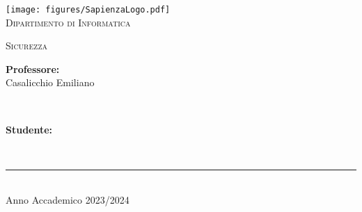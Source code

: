 \begin{titlepage}
	\centering
    \vspace*{0.5 cm}
    \texttt{[image: figures/SapienzaLogo.pdf]}\\[1.0 cm]	%

    \vspace*{-0.4cm}
    \textsc{\large Dipartimento di Informatica}\\[2.0 cm]	%
    \vspace*{1cm}

    { \fontsize{20.74pt}{18.5pt}\selectfont\bfseries \thetitle \par } %

    \vspace*{0.25cm}
    \textsc{\Large Sicurezza}\\[0.5 cm] %

    \vspace*{3.6cm}
	\begin{minipage}{0.45\textwidth} %
		\begin{flushleft} \large
			\textbf{Professore:}\\
			Casalicchio Emiliano\\
		\end{flushleft}
	\end{minipage}~
	\begin{minipage}{0.45\textwidth} %
		\begin{flushright} \large
		\begin{minipage}{1\textwidth}
		\begin{flushleft} \large
			\textbf{Studente:} \\
			\theauthor
        \end{flushleft}
        \end{minipage}
		\end{flushright}
	\end{minipage}\\[3.85 cm]

    \vspace{4cm}
    \rule{\linewidth}{0.2 mm} \\[0.3 cm]
    \vspace*{-0.2cm}
    Anno Accademico 2023/2024
\end{titlepage}